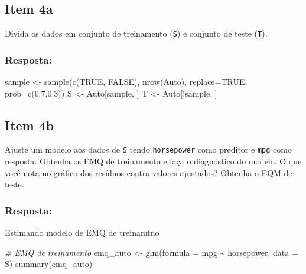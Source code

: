 \documentclass[
]{article}
\newenvironment{Shaded}{\begin{snugshade}}{\end{snugshade}}
\newcommand{\AttributeTok}[1]{\textcolor[rgb]{0.77,0.63,0.00}{#1}}
\newcommand{\CommentTok}[1]{\textcolor[rgb]{0.56,0.35,0.01}{\textit{#1}}}
\newcommand{\ConstantTok}[1]{\textcolor[rgb]{0.00,0.00,0.00}{#1}}
\newcommand{\FloatTok}[1]{\textcolor[rgb]{0.00,0.00,0.81}{#1}}
\newcommand{\FunctionTok}[1]{\textcolor[rgb]{0.00,0.00,0.00}{#1}}
\newcommand{\NormalTok}[1]{#1}
\newcommand{\OtherTok}[1]{\textcolor[rgb]{0.56,0.35,0.01}{#1}}
\newcommand{\SpecialCharTok}[1]{\textcolor[rgb]{0.00,0.00,0.00}{#1}}
\begin{document}
\hypertarget{item-4a}{%
\subsection{Item 4a}\label{item-4a}}

Divida os dados em conjunto de treinamento (\texttt{S}) e conjunto de
teste (\texttt{T}).

\hypertarget{resposta-6}{%
\subsubsection{Resposta:}\label{resposta-6}}

\begin{Shaded}
\begin{Highlighting}[]
\NormalTok{sample }\OtherTok{\textless{}{-}} \FunctionTok{sample}\NormalTok{(}\FunctionTok{c}\NormalTok{(}\ConstantTok{TRUE}\NormalTok{, }\ConstantTok{FALSE}\NormalTok{), }\FunctionTok{nrow}\NormalTok{(Auto), }\AttributeTok{replace=}\ConstantTok{TRUE}\NormalTok{, }\AttributeTok{prob=}\FunctionTok{c}\NormalTok{(}\FloatTok{0.7}\NormalTok{,}\FloatTok{0.3}\NormalTok{))}
\NormalTok{S  }\OtherTok{\textless{}{-}}\NormalTok{ Auto[sample, ]}
\NormalTok{T   }\OtherTok{\textless{}{-}}\NormalTok{ Auto[}\SpecialCharTok{!}\NormalTok{sample, ]}
\end{Highlighting}
\end{Shaded}

\hypertarget{item-4b}{%
\subsection{Item 4b}\label{item-4b}}

Ajuste um modelo aos dados de \texttt{S} tendo \texttt{horsepower} como
preditor e \texttt{mpg} como resposta. Obtenha os EMQ de treinamento e
faça o diagnóstico do modelo. O que você nota no gráfico dos resíduos
contra valores ajustados? Obtenha o EQM de teste.

\hypertarget{resposta-7}{%
\subsubsection{Resposta:}\label{resposta-7}}

Estimando modelo de EMQ de treinamtno

\begin{Shaded}
\begin{Highlighting}[]
\CommentTok{\# EMQ de treinamento}
\NormalTok{emq\_auto }\OtherTok{\textless{}{-}} \FunctionTok{glm}\NormalTok{(}\AttributeTok{formula =}\NormalTok{ mpg }\SpecialCharTok{\textasciitilde{}}\NormalTok{ horsepower, }\AttributeTok{data =}\NormalTok{ S) }
\FunctionTok{summary}\NormalTok{(emq\_auto)}
\end{Highlighting}
\end{Shaded}
\end{document}
